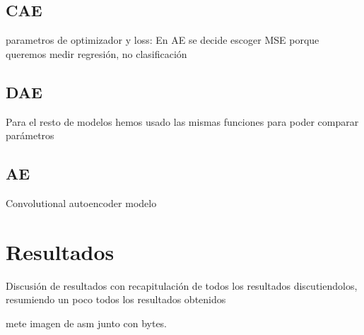  

\subsection{CAE}
parametros de optimizador y loss: \citep{guo2017deep}
En AE se decide escoger MSE porque queremos medir regresión, no clasificación
\subsection{DAE}
Para el resto de modelos hemos usado las mismas funciones para poder comparar parámetros
\subsection{AE}
Convolutional autoencoder modelo \citep{xing2022malware}




\section{Resultados}

Discusión de resultados con recapitulación de todos los resultados discutiendolos, resumiendo un poco todos los resultados obtenidos













\citep{gibert2022fusing} mete imagen de asm junto con bytes.



